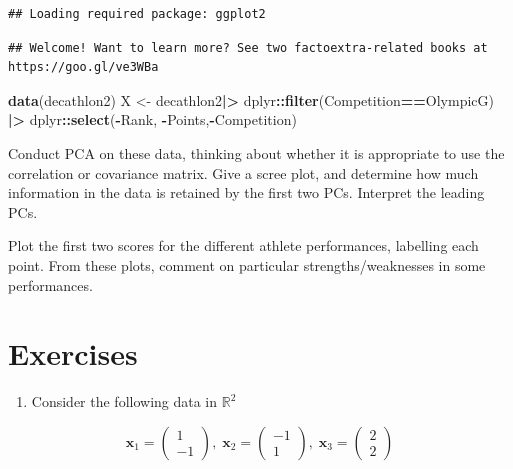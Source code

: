 \documentclass[
]{book}
\newenvironment{Shaded}{\begin{snugshade}}{\end{snugshade}}
\newcommand{\FunctionTok}[1]{\textcolor[rgb]{0.13,0.29,0.53}{\textbf{#1}}}
\newcommand{\NormalTok}[1]{#1}
\newcommand{\OtherTok}[1]{\textcolor[rgb]{0.56,0.35,0.01}{#1}}
\newcommand{\SpecialCharTok}[1]{\textcolor[rgb]{0.81,0.36,0.00}{\textbf{#1}}}
\newcommand{\StringTok}[1]{\textcolor[rgb]{0.31,0.60,0.02}{#1}}
\providecommand{\tightlist}{%
  \setlength{\itemsep}{0pt}\setlength{\parskip}{0pt}}
\theoremstyle{definition}
\theoremstyle{definition}
\theoremstyle{definition}
\theoremstyle{definition}
\theoremstyle{remark}
\begin{document}
\begin{verbatim}
## Loading required package: ggplot2
\end{verbatim}

\begin{verbatim}
## Welcome! Want to learn more? See two factoextra-related books at https://goo.gl/ve3WBa
\end{verbatim}

\begin{Shaded}
\begin{Highlighting}[]
\FunctionTok{data}\NormalTok{(decathlon2)}
\NormalTok{X }\OtherTok{\textless{}{-}}\NormalTok{ decathlon2}\SpecialCharTok{|\textgreater{}}\NormalTok{ dplyr}\SpecialCharTok{::}\FunctionTok{filter}\NormalTok{(Competition}\SpecialCharTok{==}\StringTok{\textquotesingle{}OlympicG\textquotesingle{}}\NormalTok{) }\SpecialCharTok{|\textgreater{}}\NormalTok{ dplyr}\SpecialCharTok{::}\FunctionTok{select}\NormalTok{(}\SpecialCharTok{{-}}\NormalTok{Rank, }\SpecialCharTok{{-}}\NormalTok{Points,}\SpecialCharTok{{-}}\NormalTok{Competition)}
\end{Highlighting}
\end{Shaded}

Conduct PCA on these data, thinking about whether it is appropriate to use the correlation or covariance matrix. Give a scree plot, and determine how much information in the data is retained by the first two PCs.
Interpret the leading PCs.

Plot the first two scores for the different athlete performances, labelling each point. From these plots, comment on particular strengths/weaknesses in some performances.

\section{Exercises}\label{exercises-1}

\begin{enumerate}
\def\labelenumi{\arabic{enumi}.}
\tightlist
\item
  Consider the following data in \(\mathbb{R}^2\)
\end{enumerate}

\[\mathbf x_1 =\begin{pmatrix}1\\-1\end{pmatrix},\; \mathbf x_2 =\begin{pmatrix}-1\\1\end{pmatrix},
\;\mathbf x_3 =\begin{pmatrix}2\\2\end{pmatrix}\]
\end{document}
